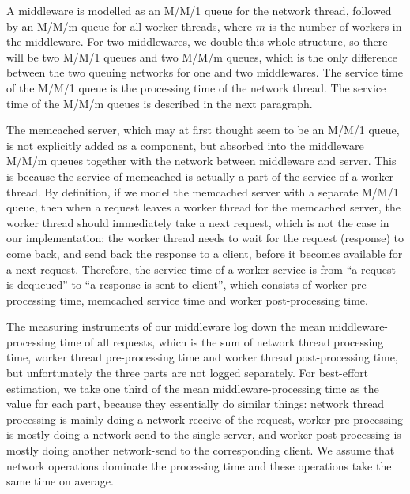 A middleware is modelled as an M/M/1 queue for the network thread, followed by an M/M/m queue for all worker threads, where $m$ is the number of workers in the middleware. For two middlewares, we double this whole structure, so there will be two M/M/1 queues and two M/M/m queues, which is the only difference between the two queuing networks for one and two middlewares. The service time of the M/M/1 queue is the processing time of the network thread. The service time of the M/M/m queues is described in the next paragraph.

The memcached server, which may at first thought seem to be an M/M/1 queue, is not explicitly added as a component, but absorbed into the middleware M/M/m queues together with the network between middleware and server. This is because the service of memcached is actually a part of the service of a worker thread. By definition, if we model the memcached server with a separate M/M/1 queue, then when a request leaves a worker thread for the memcached server, the worker thread should immediately take a next request, which is not the case in our implementation: the worker thread needs to wait for the request (response) to come back, and send back the response to a client, before it becomes available for a next request. Therefore, the service time of a worker service is from ``a request is dequeued'' to ``a response is sent to client'', which consists of worker pre-processing time, memcached service time and worker post-processing time. 

The measuring instruments of our middleware log down the mean middleware-processing time of all requests, which is the sum of network thread processing time, worker thread pre-processing time and worker thread post-processing time, but unfortunately the three parts are not logged separately. For best-effort estimation, we take one third of the mean middleware-processing time as the value for each part, because they essentially do similar things: network thread processing is mainly doing a network-receive of the request, worker pre-processing is mostly doing a network-send to the single server, and worker post-processing is mostly doing another network-send to the corresponding client. We assume that network operations dominate the processing time and these operations take the same time on average.

